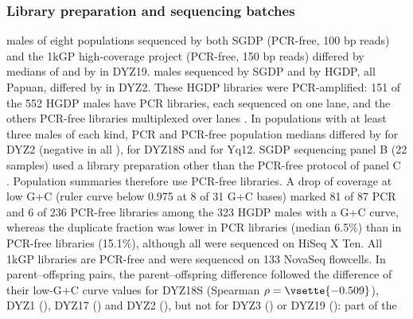 \subsubsection{Library preparation and sequencing batches}\label{sec:res-libraries}
 males of eight populations sequenced by both SGDP (PCR-free, 100 bp reads) and the 1kGP high-coverage project (PCR-free, 150 bp reads) differed by medians of  and by  in DYZ19.    males sequenced by SGDP and by HGDP, all Papuan, differed by  in DYZ2. These HGDP libraries were PCR-amplified: 151 of the 552 HGDP males have PCR libraries, each sequenced on one lane, and the others PCR-free libraries multiplexed over lanes \cite{Bergstrom2020}. In  populations with at least three males of each kind, PCR and PCR-free population medians differed by  for DYZ2 (negative in all ),  for DYZ18S and  for Yq12. SGDP sequencing panel B (22 samples) used a library preparation other than the PCR-free protocol of panel C \cite{Mallick2016}. Population summaries therefore use PCR-free libraries. A drop of coverage at low G+C (ruler curve below 0.975 at 8 of 31 G+C bases) marked 81 of 87 PCR and 6 of 236 PCR-free libraries among the 323 HGDP males with a G+C curve, whereas the duplicate fraction was lower in PCR libraries (median 6.5\%) than in PCR-free libraries (15.1\%), although all were sequenced on HiSeq X Ten. All 1kGP libraries are PCR-free and were sequenced on 133 NovaSeq flowcells.   In  parent--offspring pairs, the parent--offspring difference followed the difference of their low-G+C curve values for DYZ18S (Spearman $\rho=\vsette{-0.509}$), DYZ1 (), DYZ17 () and DYZ2 (), but not for DYZ3 () or DYZ19 (): part of the 